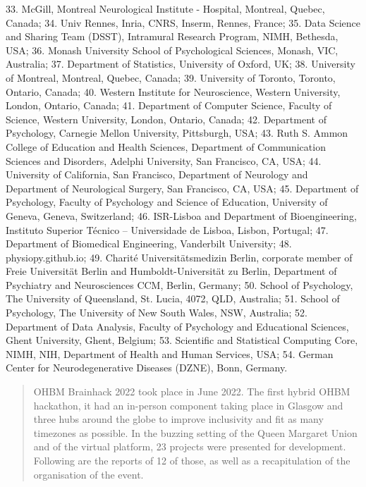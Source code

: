 \documentclass[10pt,a4paper,twocolumns]{proc}
\begin{document}
{33. McGill, Montreal Neurological Institute - Hospital, Montreal, Quebec, Canada; %
34. Univ Rennes, Inria, CNRS, Inserm, Rennes, France; %
35. Data Science and Sharing Team (DSST), Intramural Research Program, NIMH, Bethesda, USA; %
36. Monash University School of Psychological Sciences, Monash, VIC, Australia; %
37. Department of Statistics, University of Oxford, UK; %
38. University of Montreal, Montreal, Quebec, Canada; %
39. University of Toronto, Toronto, Ontario, Canada; %
40. Western Institute for Neuroscience, Western University, London, Ontario, Canada; %
41. Department of Computer Science, Faculty of Science, Western University, London, Ontario, Canada; %
42. Department of Psychology, Carnegie Mellon University, Pittsburgh, USA; %
43. Ruth S. Ammon College of Education and Health Sciences, Department of Communication Sciences and Disorders, Adelphi University, San Francisco, CA, USA; %
44. University of California, San Francisco, Department of Neurology and Department of Neurological Surgery, San Francisco, CA, USA; %
45. Department of Psychology, Faculty of Psychology and Science of Education, University of Geneva, Geneva, Switzerland; %
46. ISR-Lisboa and Department of Bioengineering, Instituto Superior Técnico – Universidade de Lisboa, Lisbon, Portugal; %
47. Department of Biomedical Engineering, Vanderbilt University; %
48. physiopy.github.io; %
49. Charité Universitätsmedizin Berlin, corporate member of Freie Universität Berlin and Humboldt-Universität zu Berlin, Department of Psychiatry and Neurosciences CCM, Berlin, Germany; %
50. School of Psychology, The University of Queensland, St. Lucia, 4072, QLD, Australia; %
51. School of Psychology, The University of New South Wales, NSW, Australia; %
52. Department of Data Analysis, Faculty of Psychology and Educational Sciences, Ghent University, Ghent, Belgium; %
53. Scientific and Statistical Computing Core, NIMH, NIH, Department of Health and Human Services, USA; %
54. German Center for Neurodegenerative Diseases (DZNE), Bonn, Germany.%
}
\\

\begin{abstract}
OHBM Brainhack 2022 took place in June 2022. The first hybrid OHBM hackathon, it had an in-person component taking place in Glasgow and three hubs around the globe to improve inclusivity and fit as many timezones as possible.
In the buzzing setting of the Queen Margaret Union and of the virtual platform, 23 projects were presented for development.
Following are the reports of 12 of those, as well as a recapitulation of the organisation of the event. 
\end{abstract}
\end{document}
